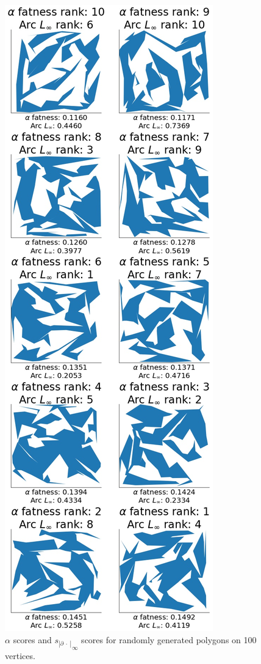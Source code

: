 \documentclass[]{jocg}
\newcommand{\abs}[1]{|#1|}
\newcommand{\chordarc}{{s_{\abs{\partial~\cdot~}}}}
\theoremstyle{definition}
\theoremstyle{remark}
\begin{document}
\begin{figure}[t]
  \centering
  \includegraphics[height=0.8\textheight]{../plots/u_100_alpha_score_chord_arc_infinity_vertices_0-05_delta_ranking.jpg}
  \caption{$\alpha$ scores and ${\chordarc}_{\infty}$ scores for randomly
  generated polygons on 100 vertices.}
  \label{fig:alph-inft-100}
\end{figure}
\end{document}
